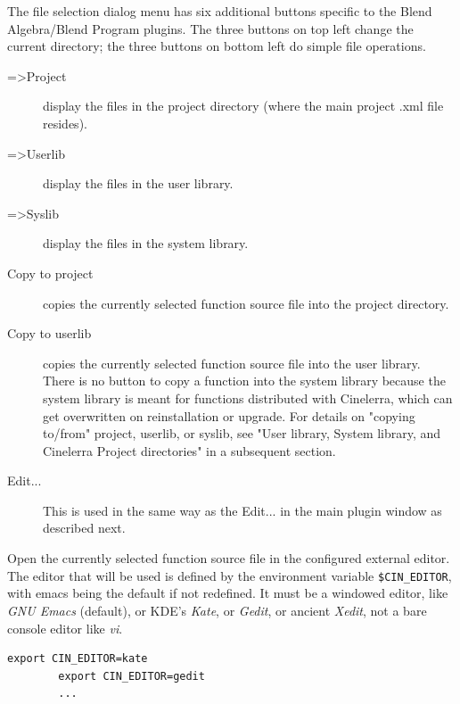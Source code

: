 \begin{description}
	\item The file selection dialog menu has six additional buttons specific to the Blend Algebra/Blend Program plugins. The three buttons on top left change the current directory; the three buttons on bottom left do simple file operations.
	\begin{description}
		\item[=>Project] display the files in the project directory (where the main project .xml file resides).
		\item[=>Userlib] display the files in the user library.
		\item[=>Syslib] display the files in the system library.
		\item[Copy to project] copies the currently selected function source file into the project directory.
		\item[Copy to userlib] copies the currently selected function source file into the user library. There is no button to copy a function into the system library because the system library is meant for functions distributed with Cinelerra, which can get overwritten on reinstallation or upgrade. For details on "copying to/from" project, userlib, or syslib, see 
"User library, System library, and Cinelerra Project directories" in a subsequent section.

		\item[Edit...] This is used in the same way as the Edit... in the main plugin window as described next.
	\end{description}
	\item[Edit...] Open the currently selected function source file in the configured external editor. The editor that will be used is defined by the environment variable \texttt{\$CIN\_EDITOR}, with emacs being the default if not redefined. It must be a windowed editor, like \textit{GNU Emacs} (default), or KDE's \textit{Kate}, or \textit{Gedit}, or ancient \textit{Xedit}, not a bare console editor like \textit{vi}.
	\begin{lstlisting}[style=sh]
		export CIN_EDITOR=kate
		export CIN_EDITOR=gedit
		...
		

\end{lstlisting}
\end{description}
